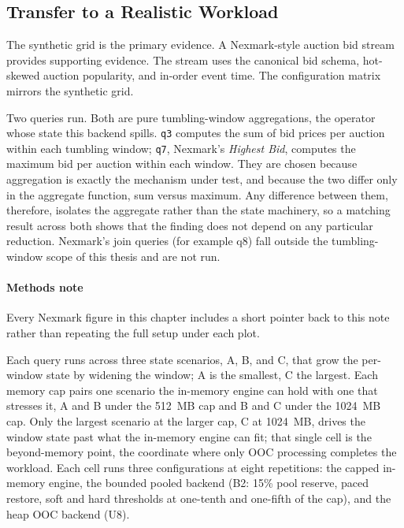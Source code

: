 \FloatBarrier
\FloatBarrier
\subsection{Transfer to a Realistic Workload\label{sec:nexmark}}

The synthetic grid is the primary evidence.
A Nexmark-style auction bid stream provides supporting evidence.
The stream uses the canonical bid schema, hot-skewed auction popularity, and in-order event time.
The configuration matrix mirrors the synthetic grid.

Two queries run. Both are pure tumbling-window aggregations, the operator whose state this backend spills.
\texttt{q3} computes the sum of bid prices per auction within each tumbling window; \texttt{q7}, Nexmark's \emph{Highest Bid}, computes the maximum bid per auction within each window.
They are chosen because aggregation is exactly the mechanism under test, and because the two differ only in the aggregate function, sum versus maximum.
Any difference between them, therefore, isolates the aggregate rather than the state machinery, so a matching result across both shows that the finding does not depend on any particular reduction.
Nexmark's join queries (for example q8) fall outside the tumbling-window scope of this thesis and are not run.

\paragraph{Methods note\label{sec:methods-nexmark}}
Every Nexmark figure in this chapter includes a short pointer back to this note rather than repeating the full setup under each plot.

\nexmarknotefull

Each query runs across three state scenarios, A, B, and C, that grow the per-window state by widening the window; A is the smallest, C the largest.
Each memory cap pairs one scenario the in-memory engine can hold with one that stresses it, A and B under the 512\, MB cap and B and C under the 1024\, MB cap.
Only the largest scenario at the larger cap, C at 1024\, MB, drives the window state past what the in-memory engine can fit; that single cell is the beyond-memory point, the coordinate where only \ac{OOC} processing completes the workload.
Each cell runs three configurations at eight repetitions: the capped in-memory engine, the bounded pooled backend (B2: 15\% pool reserve, paced restore, soft and hard thresholds at one-tenth and one-fifth of the cap), and the heap \ac{OOC} backend (U8).

